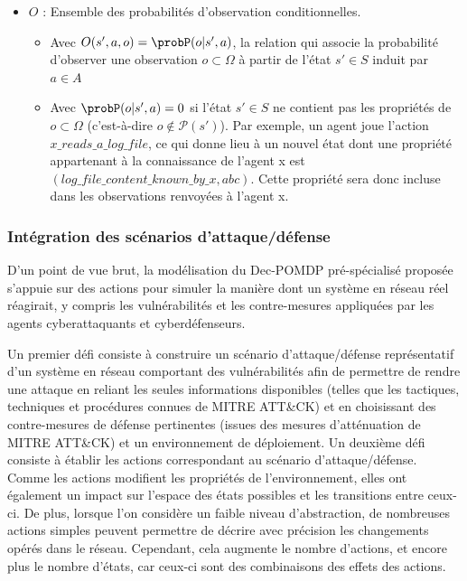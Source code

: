 \begin{itemize}
    \item $O$ : Ensemble des probabilités d'observation conditionnelles.
          \begin{itemize}
              \item Avec $O(s',a,o) = \probP(o|s',a)$, la relation qui associe la probabilité d'observer une observation $o \subset \Omega$ à partir de l'état $s' \in S$ induit par $a \in A$
              \item Avec $\probP(o|s',a) = 0$ si l'état $s' \in S$ ne contient pas les propriétés de $o \subset \Omega$ (c'est-à-dire $o \not\in \mathcal{P}(s')$). Par exemple, un agent joue l'action $x\_reads\_a\_log\_file$, ce qui donne lieu à un nouvel état dont une propriété appartenant à la connaissance de l'agent x est $(log\_file\_content\_known\_by\_x, \allowbreak abc)$. Cette propriété sera donc incluse dans les observations renvoyées à l'agent x.
          \end{itemize}

\end{itemize}


\subsubsection{Intégration des scénarios d’attaque/défense}

\noindent
D'un point de vue brut, la modélisation du Dec-POMDP pré-spécialisé proposée s'appuie sur des actions pour simuler la manière dont un système en réseau réel réagirait, y compris les vulnérabilités et les contre-mesures appliquées par les agents cyberattaquants et cyberdéfenseurs.

Un premier défi consiste à construire un scénario d'attaque/défense représentatif d'un système en réseau comportant des vulnérabilités afin de permettre de rendre une attaque en reliant les seules informations disponibles (telles que les tactiques, techniques et procédures connues de MITRE ATT\&CK) et en choisissant des contre-mesures de défense pertinentes (issues des mesures d'atténuation de MITRE ATT\&CK) et un environnement de déploiement. Un deuxième défi consiste à établir les actions correspondant au scénario d'attaque/défense. Comme les actions modifient les propriétés de l'environnement, elles ont également un impact sur l'espace des états possibles et les transitions entre ceux-ci.
De plus, lorsque l'on considère un faible niveau d'abstraction, de nombreuses actions simples peuvent permettre de décrire avec précision les changements opérés dans le réseau. Cependant, cela augmente le nombre d'actions, et encore plus le nombre d'états, car ceux-ci sont des combinaisons des effets des actions.

